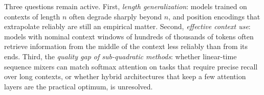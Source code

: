 \documentclass[11pt]{article}
\begin{document}
Three questions remain active. First, \emph{length generalization}: models trained on contexts of length $n$ often degrade sharply beyond $n$, and position encodings that extrapolate reliably are still an empirical matter. Second, \emph{effective context use}: models with nominal context windows of hundreds of thousands of tokens often retrieve information from the middle of the context less reliably than from its ends. Third, the \emph{quality gap of sub-quadratic methods}: whether linear-time sequence mixers can match softmax attention on tasks that require precise recall over long contexts, or whether hybrid architectures that keep a few attention layers are the practical optimum, is unresolved.



\end{document}

